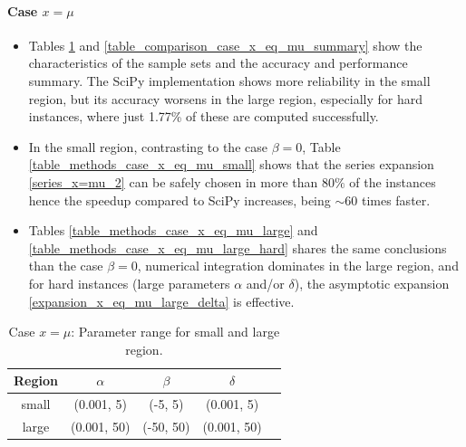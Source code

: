 \documentclass[10pt,a4paper,oneside]{article}
\numberwithin{equation}{section}
\begin{document}
\newpage
\paragraph{Case $x = \mu$}
\begin{itemize}
\item Tables \ref{table_parameters_case_x_eq_mu} and \ref{table_comparison_case_x_eq_mu_summary} show the characteristics of the sample sets and the accuracy and performance summary. The SciPy implementation shows more reliability in the small region, but its accuracy worsens in the large region, especially for hard instances, where just 1.77\% of these are computed successfully.
\item In the small region, contrasting to the case $\beta = 0$, Table \ref{table_methods_case_x_eq_mu_small} shows that the series expansion \eqref{series_x=mu_2} can be safely chosen in more than $80\%$ of the instances hence the speedup compared to SciPy increases, being $\sim 60$ times faster.
\item Tables \ref{table_methods_case_x_eq_mu_large} and \ref{table_methods_case_x_eq_mu_large_hard} shares the same conclusions than the case $\beta = 0$, numerical integration dominates in the large region, and for hard instances (large parameters $\alpha$ and/or $\delta$), the asymptotic expansion \eqref{expansion_x_eq_mu_large_delta} is effective.
\end{itemize}

\begin{table}[htbp]
\centering
\scalebox{0.9}
{
	\begin{tabular}{c|cccc}
	\hline
	Region & $\alpha$ & $\beta$ & $\delta$\\
	\hline	
	small & (0.001, 5) & (-5, 5) & (0.001, 5)\\
	large & (0.001, 50) & (-50, 50) & (0.001, 50)\\
	\hline
	\end{tabular}
}
\caption{Case $x = \mu$: Parameter range for small and large region.}
	\label{table_parameters_case_x_eq_mu}
\end{table}
\end{document}
